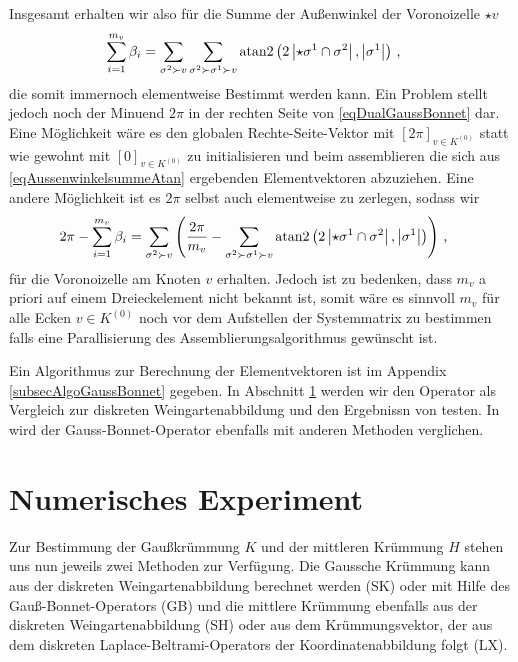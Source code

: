     Insgesamt erhalten wir also für die Summe der Außenwinkel der Voronoizelle \( \star v \)
    \begin{align}
      \label{eqAussenwinkelsummeAtan}
      \sum_{i=1}^{m_{v}}\beta_{i} &= \sum_{\sigma^{2}\succ v} \sum_{\sigma^{2}\succ\sigma^{1}\succ v}
                               \text{atan2}\left( 2\left|\star\sigma^{1} \cap \sigma^{2} \right|, 
                                 \left|\sigma^{1}\right|\right) \,\text{,}       
    \end{align}
    die somit immernoch elementweise Bestimmt werden kann.
    Ein Problem stellt jedoch noch der Minuend \( 2\pi \) in der rechten Seite von \ref{eqDualGaussBonnet} dar.
    Eine Möglichkeit wäre es den globalen Rechte-Seite-Vektor mit \( \left[ 2\pi \right]_{v\in K^{(0)}} \) statt wie
    gewohnt mit \( \left[ 0 \right]_{v\in K^{(0)}} \) zu initialisieren und beim assemblieren die sich aus 
    \eqref{eqAussenwinkelsummeAtan} ergebenden Elementvektoren abzuziehen.
    Eine andere Möglichkeit ist es \( 2\pi \) selbst auch elementweise zu zerlegen, sodass wir
    \begin{align}
      2\pi - \sum_{i=1}^{m_{v}}\beta_{i} &=
          \sum_{\sigma^{2}\succ v} \left( \frac{2\pi}{m_{v}} - \sum_{\sigma^{2}\succ\sigma^{1}\succ v}
                               \text{atan2}\left( 2\left|\star\sigma^{1} \cap \sigma^{2} \right|, 
                                 \left|\sigma^{1}\right|\right) \right)\,\text{,}
    \end{align}
    für die Voronoizelle am Knoten \( v \) erhalten. 
    Jedoch ist zu bedenken, dass \( m_{v} \) a priori auf einem Dreieckelement nicht bekannt ist, 
    somit wäre es sinnvoll \( m_{v} \) für alle Ecken \( v\in K^{(0)} \) noch vor dem Aufstellen der Systemmatrix zu bestimmen falls eine
    Parallisierung des Assemblierungsalgorithmus gewünscht ist.

    Ein Algorithmus zur Berechnung der Elementvektoren ist im Appendix \ref{subsecAlgoGaussBonnet} gegeben.
    In Abschnitt \ref{secNumEx} werden wir den Operator als Vergleich zur diskreten Weingartenabbildung und den Ergebnissn von \cite{heine} testen. 
    In \cite{meyer} wird der Gauss-Bonnet-Operator ebenfalls mit anderen Methoden verglichen.

\section{Numerisches Experiment}
\label{secNumEx}
  
  Zur Bestimmung der Gaußkrümmung \( K \) und der mittleren Krümmung \( H \) stehen uns nun jeweils zwei Methoden zur Verfügung.
  Die Gaussche Krümmung kann aus der diskreten Weingartenabbildung berechnet werden (SK) oder mit Hilfe des Gauß-Bonnet-Operators (GB)
  und die mittlere Krümmung ebenfalls aus der diskreten Weingartenabbildung (SH) oder aus dem Krümmungsvektor, der aus dem diskreten Laplace-Beltrami-Operators der Koordinatenabbildung
  folgt (LX).

